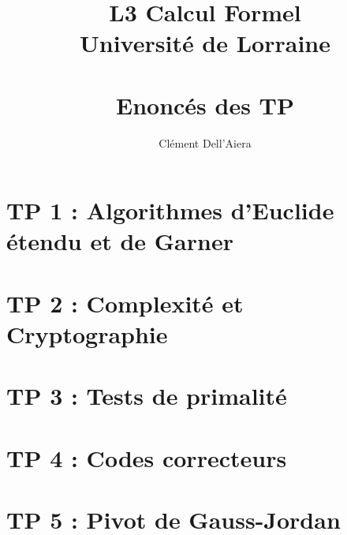 \documentclass[a4paper]{report}
\title{L3 Calcul Formel  \\ Université de Lorraine \\ ~ \\
\textbf{Enoncés des TP}}
\date{} %
\author{ Clément Dell'Aiera }
\begin{document}
  
\maketitle
\tableofcontents

\chapter{TP 1 : Algorithmes d'Euclide étendu et de Garner}


\chapter{TP 2 : Complexité et Cryptographie}


\chapter{TP 3 : Tests de primalité}


\chapter{TP 4 : Codes correcteurs}


\chapter{TP 5 : Pivot de Gauss-Jordan}




\nocite{*}
\end{document}
